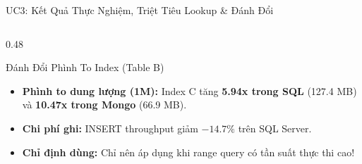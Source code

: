 \documentclass[aspectratio=169,9pt]{beamer}
\begin{document}
\begin{frame}{UC3: Kết Quả Thực Nghiệm, Triệt Tiêu Lookup \& Đánh Đổi}
\begin{columns}[T]
\begin{column}{0.48\textwidth}
\begin{alertblock}{Đánh Đổi Phình To Index (Table B)}
\scriptsize
\begin{itemize}
  \item \textbf{Phình to dung lượng (1M):} Index C tăng \textbf{5.94x trong SQL} (127.4 MB) và \textbf{10.47x trong Mongo} (66.9 MB).
  \item \textbf{Chi phí ghi:} INSERT throughput giảm $-14.7\%$ trên SQL Server.
  \item \textbf{Chỉ định dùng:} Chỉ nên áp dụng khi range query có tần suất thực thi cao!
\end{itemize}
\end{alertblock}
\end{column}
\end{columns}
\end{frame}
\end{document}
